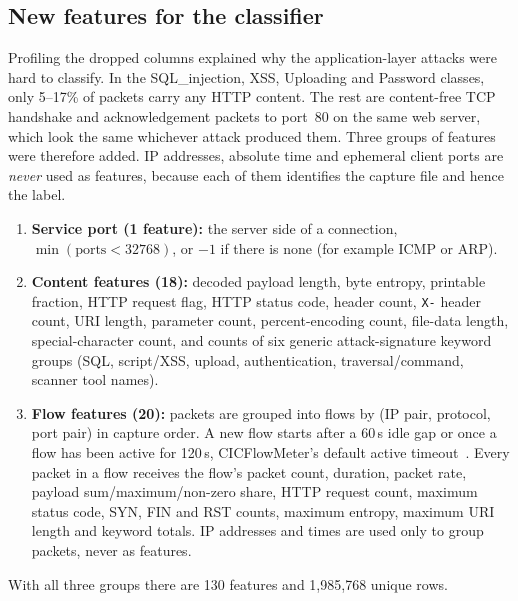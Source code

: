 \subsection{New features for the classifier}\label{sec:newfeat}
Profiling the dropped columns explained why the application-layer attacks were hard to classify. In the SQL\_injection, XSS, Uploading and Password classes, only 5--17\% of packets carry any HTTP content. The rest are content-free TCP handshake and acknowledgement packets to port~80 on the same web server, which look the same whichever attack produced them. Three groups of features were therefore added. IP addresses, absolute time and ephemeral client ports are \emph{never} used as features, because each of them identifies the capture file and hence the label.
\begin{enumerate}
  \item \textbf{Service port (1 feature):} the server side of a connection, $\min(\text{ports} < 32768)$, or $-1$ if there is none (for example ICMP or ARP).
  \item \textbf{Content features (18):} decoded payload length, byte entropy, printable fraction, HTTP request flag, HTTP status code, header count, \texttt{X-} header count, URI length, parameter count, percent-encoding count, file-data length, special-character count, and counts of six generic attack-signature keyword groups (SQL, script/XSS, upload, authentication, traversal/command, scanner tool names).
  \item \textbf{Flow features (20):} packets are grouped into flows by (IP pair, protocol, port pair) in capture order. A new flow starts after a 60\,s idle gap or once a flow has been active for 120\,s, CICFlowMeter's default active timeout~\cite{sharafaldin2018cicids}. Every packet in a flow receives the flow's packet count, duration, packet rate, payload sum/maximum/non-zero share, HTTP request count, maximum status code, SYN, FIN and RST counts, maximum entropy, maximum URI length and keyword totals. IP addresses and times are used only to group packets, never as features.
\end{enumerate}
With all three groups there are 130 features and 1{,}985{,}768 unique rows.

